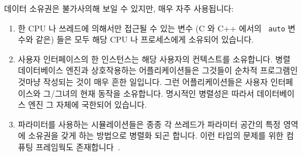 데이터 소유권은 불가사의해 보일 수 있지만, 매우 자주 사용됩니다:

\begin{enumerate}
\item	한 CPU 나 쓰레드에 의해서만 접근될 수 있는 변수 (C 와 C++ 에서의 {\tt
	auto} 변수와 같은) 들은 모두 해당 CPU 나 프로세스에게 소유되어
	있습니다.
\item	사용자 인터페이스의 한 인스턴스는 해당 사용자의 컨텍스트를 소유합니다.
	병렬 데이터베이스 엔진과 상호작용하는 어플리케이션들은 그것들이 순차적
	프로그램인 것마냥 작성되는 것이 매우 흔한 일입니다.
	그런 어플리케이션들은 사용자 인터페이스와 그/그녀의 현재 동작을
	소유합니다.
	명시적인 병렬성은 따라서 데이터베이스 엔진 그 자체에 국한되어 있습니다.
\item	파라미터를 사용하는 시뮬레이션들은 종종 각 쓰레드가 파라미터 공간의
	특정 영역에 소유권을 갖게 하는 방법으로 병렬화 되곤 합니다.
	이런 타입의 문제를 위한 컴퓨팅 프레임웍도 존재합니다~\cite{BOINC2008}.

\end{enumerate}

